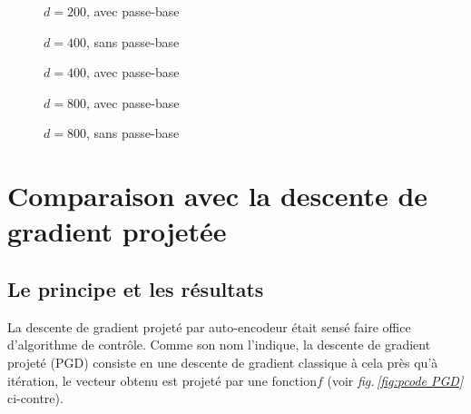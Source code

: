\documentclass[hidelinks, french]{article} %
\newcommand{\figref}[1]{\textit{fig.\,\ref{#1}}}
\theoremstyle{enonce}
\theoremstyle{special}
\theoremstyle{rq}
\theoremstyle{exo}
\theoremstyle{demo}
\begin{document}
\begin{figure}[H]\centering
	
	\caption{$d=200$, avec passe-base}
	\label{fig:LGDlat200-g}
\end{figure}

\begin{figure}[H]\centering
	
	\caption{$d=400$, sans passe-base}
	\label{fig:LGDlat400-s}
\end{figure}

\begin{figure}[H]\centering
	
	\caption{$d=400$, avec passe-base}
	\label{fig:LGDlat400-g}
\end{figure}

\begin{figure}[H]\centering
	
	\caption{$d=800$, avec passe-base}
	\label{fig:LGDlat800-s}
\end{figure}

\begin{figure}[H]\centering
	
	\caption{$d=800$, sans passe-base}
	\label{fig:LGDlat800-g}
\end{figure}





\newpage



\section{Comparaison avec la descente de gradient projetée}\label{sec:comparPGD}

\subsection{Le principe et les résultats}\label{sec:PGD}
\quad 

La descente de gradient projeté par auto-encodeur était sensé faire office d'algorithme de contrôle. Comme son nom l'indique, la descente de gradient projeté (PGD) consiste en une descente de gradient classique à cela près qu'à itération, le vecteur obtenu est projeté par une fonction$f$ (voir \figref{fig:pcode PGD} ci-contre). 
\end{document}
